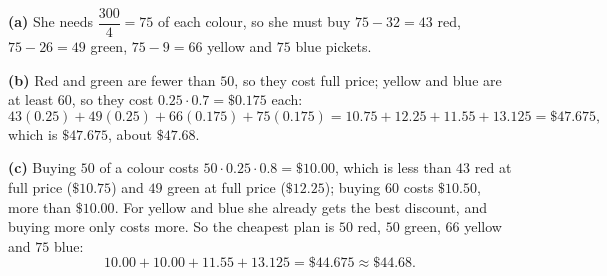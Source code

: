 \textbf{(a)} She needs $\dfrac{300}{4}=75$ of each colour, so she must buy $75-32=43$ red, $75-26=49$ green, $75-9=66$ yellow and $75$ blue pickets.

\textbf{(b)} Red and green are fewer than $50$, so they cost full price; yellow and blue are at least $60$, so they cost $0.25\cdot0.7=\$0.175$ each:
\[
43(0.25)+49(0.25)+66(0.175)+75(0.175)=10.75+12.25+11.55+13.125=\$47.675,
\]
which is $\boxed{\$47.675}$, about $\$47.68$.

\textbf{(c)} Buying $50$ of a colour costs $50\cdot0.25\cdot0.8=\$10.00$, which is less than $43$ red at full price ($\$10.75$) and $49$ green at full price ($\$12.25$); buying $60$ costs $\$10.50$, more than $\$10.00$. For yellow and blue she already gets the best discount, and buying more only costs more. So the cheapest plan is $50$ red, $50$ green, $66$ yellow and $75$ blue:
\[
10.00+10.00+11.55+13.125=\boxed{\$44.675}\approx\$44.68 .
\]
